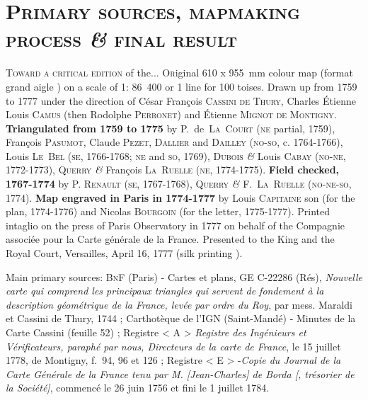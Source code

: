 \documentclass[portrait, A0]{sciposter}
\begin{document}
\begin{minipage}[b]{75cm}
\section{\normalfont \textsc{Primary sources, mapmaking process \textit{\&} final result}}

\begin{multicols}{3}
\setlength{\columnsep}{80pt}

\textsc{Toward a critical edition} \small{of the...}
\vfill
\normalsize
\lettrine{O}riginal 610 x 955~mm colour map (format \og grand aigle \fg) on a scale of 1: 86~400 or 1 line for 100 toises. Drawn up from 1759 to 1777 under the direction of César François \textsc{Cassini de Thury}, Charles Étienne Louis \textsc{Camus} (then Rodolphe \textsc{Perronet}) and Étienne \textsc{Mignot de Montigny}. \textbf{Triangulated from 1759 to 1775} by P.~de~\textsc{La~Court} (\textsc{ne} partial, 1759), François \textsc{Pasumot}, Claude \textsc{Pezet}, \textsc{Dallier} and \textsc{Dailley} (\textsc{no-so}, c. 1764-1766), Louis \textsc{Le~Bel} (\textsc{se}, 1766-1768; \textsc{ne} and \textsc{so}, 1769), \textsc{Dubois} \textit{\&} Louis \textsc{Cabay} (\textsc{no-ne}, 1772-1773), Q\textsc{uerry} \textit{\&} François \textsc{La~Ruelle} (\textsc{ne}, 1774-1775). \textbf{Field checked, 1767-1774} by P. \textsc{Renault} (\textsc{se}, 1767-1768), Q\textsc{uerry} \textit{\&} F.~\textsc{La~Ruelle} (\textsc{no-ne-so}, 1774). \textbf{Map engraved in Paris in 1774-1777} by Louis \textsc{Capitaine} son (for the plan, 1774-1776) and Nicolas \textsc{Bourgoin} (for the letter, 1775-1777). Printed intaglio on the press of Paris Observatory in 1777 on behalf of the Compagnie associée pour la Carte générale de la France. Presented to the King and the Royal Court, Versailles, April 16, 1777 (\og silk printing \fg).\\
\vfill


\scriptsize Main primary sources: \textsc{BnF} (Paris) - Cartes et plans, GE C-22286 (Rés), \textit{Nouvelle carte qui comprend les principaux triangles qui servent de fondement à la description géométrique de la France, levée par ordre du Roy}, par mess. Maraldi et Cassini de Thury, 1744 ; Carthotèque de l'IGN (Saint-Mandé) - Minutes de la Carte Cassini (feuille 52) ; Registre < A > \textit{Registre des Ingénieurs et Vérificateurs, paraphé par nous, Directeurs de la carte de France}, le 15 juillet 1778, de Montigny, f.~94, 96 et 126 ; Registre  < E > -\textit{Copie du Journal de la Carte Générale de la France tenu par M. [Jean-Charles] de Borda [, trésorier de la Société]}, commencé le 26 juin 1756 et fini le 1 juillet 1784.


\end{multicols}
\end{minipage}
\end{document}
